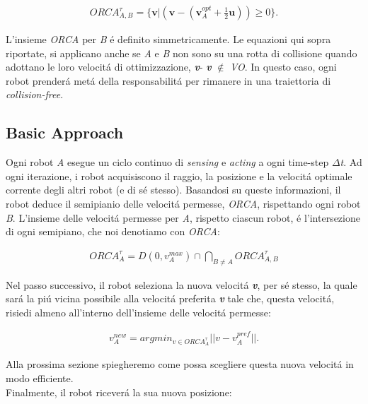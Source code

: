  \begin{gather}
 {ORCA}^{\tau}_{A,B} = \{ \boldsymbol{v}|( \boldsymbol{v} -(\boldsymbol{v}^{opt}_{A} + \frac{1}{2}\boldsymbol{u})) \geq 0  \}.
\end{gather}

L'insieme \textit{ORCA}\ap{$\tau$} per \textit{B} \'e definito simmetricamente. Le equazioni qui sopra riportate, si applicano anche se \textit{A} e \textit{B} non sono su una rotta di collisione quando adottano le loro velocit\'a di ottimizzazione, {\bfseries\textit{v}}- 
{\bfseries\textit{v}} $\notin$ \textit{VO}\ap{$\tau$}.
In questo caso, ogni robot prender\'a met\'a della responsabilit\'a per rimanere in una traiettoria di \textit{collision-free}.

\subsection{Basic Approach}

Ogni robot \textit{A} esegue un ciclo continuo di \textit{sensing} e \textit{acting} a ogni time-step $\Delta$\textit{t}. Ad ogni iterazione, i robot acquisiscono il raggio, la posizione e la velocit\'a optimale corrente degli altri robot (e di s\'e stesso). Basandosi su queste informazioni, il robot deduce il semipianio delle velocit\'a permesse,  \textit{ORCA}\ap{$\tau$}, rispettando ogni robot \textit{B}. L'insieme delle velocit\'a permesse per \textit{A}, rispetto ciascun robot, \'e l'intersezione di ogni semipiano, che noi denotiamo con \textit{ORCA}\ap{$\tau$}:

 \begin{gather}
 {ORCA}^{\tau}_{A} =D(0,v^{max}_{A}) \cap \bigcap_{B \neq A} ORCA^{\tau}_{A,B}
\end{gather}

Nel passo successivo, il robot seleziona la nuova velocit\'a {\bfseries\textit{v}}, per s\'e stesso, la quale sar\'a la pi\'u vicina possibile alla velocit\'a preferita {\bfseries\textit{v}} tale che, questa velocit\'a, risiedi almeno all'interno dell'insieme delle velocit\'a permesse:

 \begin{gather}
 {v}^{new}_{A} = argmin_{v \in ORCA^{\tau}_{A}}||v-v^{pref}_{A}||.
\end{gather}

Alla prossima sezione spiegheremo come possa scegliere questa nuova velocit\'a in modo efficiente.\\ Finalmente, il robot ricever\'a la sua nuova posizione:

